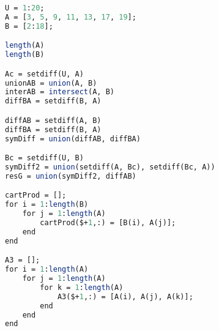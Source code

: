 \begin{lstlisting}[language=Scilab, basicstyle=\small\ttfamily, breaklines=true]
U = 1:20;
A = [3, 5, 9, 11, 13, 17, 19];
B = [2:18];

length(A)
length(B)

Ac = setdiff(U, A)
unionAB = union(A, B)
interAB = intersect(A, B)
diffBA = setdiff(B, A)

diffAB = setdiff(A, B)
diffBA = setdiff(B, A)
symDiff = union(diffAB, diffBA)

Bc = setdiff(U, B)
symDiff2 = union(setdiff(A, Bc), setdiff(Bc, A))
resG = union(symDiff2, diffAB)

cartProd = [];
for i = 1:length(B)
    for j = 1:length(A)
        cartProd($+1,:) = [B(i), A(j)];
    end
end

A3 = [];
for i = 1:length(A)
    for j = 1:length(A)
        for k = 1:length(A)
            A3($+1,:) = [A(i), A(j), A(k)];
        end
    end
end
\end{lstlisting}
